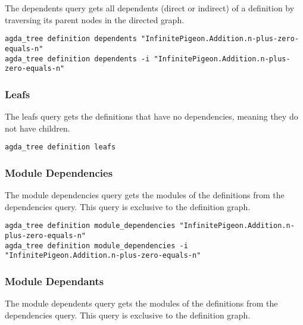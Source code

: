 The dependents query gets all dependents (direct or indirect) of a
definition by traversing its parent nodes in the directed graph.

\noindent
\begin{minipage}{\textwidth}
\begin{lstlisting}
agda_tree definition dependents "InfinitePigeon.Addition.n-plus-zero-equals-n"
agda_tree definition dependents -i "InfinitePigeon.Addition.n-plus-zero-equals-n"
\end{lstlisting}
\end{minipage}

\subsubsection{Leafs}

The leafs query gets the definitions that have no dependencies, meaning they do
not have children.

\noindent
\begin{minipage}{\textwidth}
\begin{lstlisting}
agda_tree definition leafs
\end{lstlisting}
\end{minipage}

\subsubsection{Module Dependencies}

The module dependencies query gets the modules of the definitions from the
dependencies query. This query is exclusive to the definition graph. 

\noindent
\begin{minipage}{\textwidth}
\begin{lstlisting}
agda_tree definition module_dependencies "InfinitePigeon.Addition.n-plus-zero-equals-n"
agda_tree definition module_dependencies -i "InfinitePigeon.Addition.n-plus-zero-equals-n"
\end{lstlisting}
\end{minipage}

\subsubsection{Module Dependants}

The module dependents query gets the modules of the definitions from the
dependencies query. This query is exclusive to the definition graph. 

